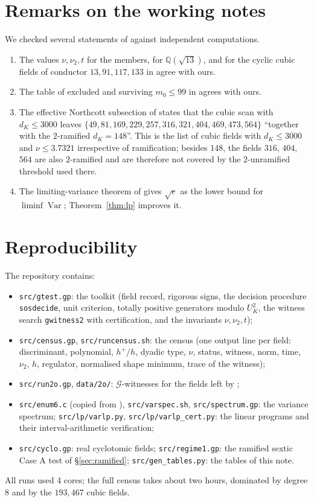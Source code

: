 \documentclass[11pt,reqno]{amsart}
\theoremstyle{plain}
\theoremstyle{definition}
\newcommand{\Q}{\mathbb{Q}}
\newcommand{\Gcl}{\mathcal{G}}
\DeclareMathOperator{\Var}{Var}
\begin{document}
\section{Remarks on the working notes}\label{sec:corrections}
We checked several statements of \cite{PB,PD} against independent computations.
\begin{enumerate}
\item The values $\nu,\nu_2,t$ for the members, for $\Q(\sqrt{13})$, and for the cyclic cubic fields
of conductor $13,91,117,133$ in \cite[shape section]{PB} agree with ours.
\item The table of excluded and surviving $m_0\le99$ in \cite[table of $m_0\le99$]{PD} agrees with ours.
\item The effective Northcott subsection of \cite{PB} states that the cubic scan with $d_K\le3000$ leaves
$\{49,81,169,229,257,316,321,404,469,473,564\}$ ``together with the $2$-ramified $d_K=148$''. This
is the list of cubic fields with $d_K\le3000$ and $\nu\le3.7321$ irrespective of ramification;
besides $148$, the fields $316$, $404$, $564$ are also $2$-ramified and are therefore not covered
by the $2$-unramified threshold used there.
\item The limiting-variance theorem of \cite{PB} gives $\sqrt e$ as the lower bound for $\liminf\Var$;
Theorem~\ref{thm:lp} improves it.
\end{enumerate}

\section{Reproducibility}\label{sec:repro}
The repository contains:
\begin{itemize}
\item \texttt{src/gtest.gp}: the toolkit (field record, rigorous signs, the decision procedure
\texttt{sosdecide}, unit criterion, totally positive generators modulo $U_K^{2}$, the witness search
\texttt{gwitness2} with certification, and the invariants $\nu,\nu_2,t$);
\item \texttt{src/census.gp}, \texttt{src/runcensus.sh}: the census (one output line per field:
discriminant, polynomial, $h^+/h$, dyadic type, $\nu$, status, witness, norm, time, $\nu_2$, $h$,
regulator, normalised shape minimum, trace of the witness);
\item \texttt{src/run2o.gp}, \texttt{data/2o/}: $\Gcl$-witnesses for the fields left by \cite{TwoO};
\item \texttt{src/enum6.c} (copied from \cite{TwoO}), \texttt{src/varspec.sh},
\texttt{src/spectrum.gp}: the variance spectrum; \texttt{src/lp/varlp.py}, \texttt{src/lp/varlp\_cert.py}:
the linear programs and their interval-arithmetic verification;
\item \texttt{src/cyclo.gp}: real cyclotomic fields; \texttt{src/regime1.gp}: the ramified sextic
Case A test of \S\ref{sec:ramified}; \texttt{src/gen\_tables.py}: the tables of this note.
\end{itemize}
All runs used 4 cores; the full census takes about two hours, dominated by degree $8$ and by the
$193{,}467$ cubic fields.
\end{document}
